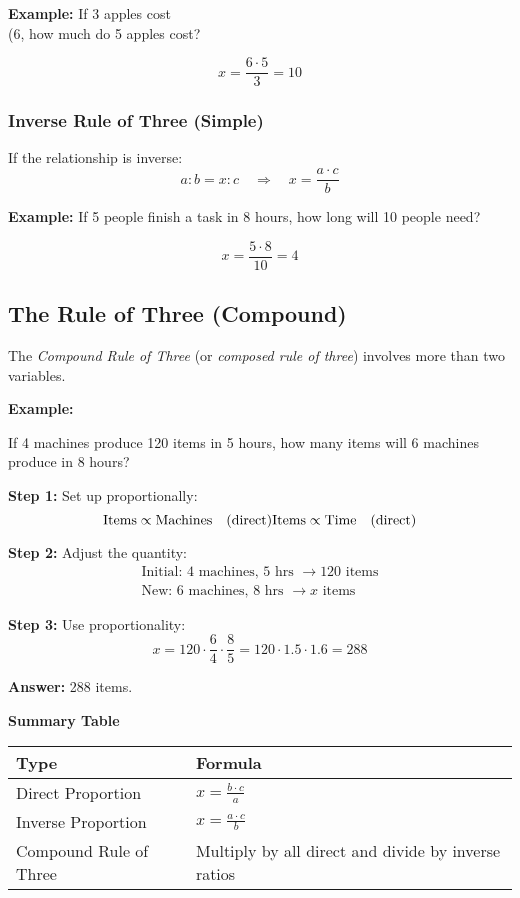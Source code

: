 \textbf{Example:} If 3 apples cost \\(6, how much do 5 apples cost?

\[
x = \frac{6 \cdot 5}{3} = 10
\]

\subsubsection*{Inverse Rule of Three (Simple)}

If the relationship is inverse:
\[
a : b = x : c \quad \Rightarrow \quad x = \frac{a \cdot c}{b}
\]

\textbf{Example:} If 5 people finish a task in 8 hours, how long will 10 people need?

\[
x = \frac{5 \cdot 8}{10} = 4
\]

\subsection{The Rule of Three (Compound)}

The \emph{Compound Rule of Three} (or \emph{composed rule of three}) involves more than two variables.

\textbf{Example:} 

If 4 machines produce 120 items in 5 hours, how many items will 6 machines produce in 8 hours?

\textbf{Step 1:} Set up proportionally:
\[
\text{Items} \propto \text{Machines} \quad (\text{direct}) \\
\text{Items} \propto \text{Time} \quad (\text{direct})
\]

\textbf{Step 2:} Adjust the quantity:
\begin{align*}
\text{Initial: } 4 \text{ machines, } 5 \text{ hrs } \rightarrow 120 \text{ items} \\
\text{New: } 6 \text{ machines, } 8 \text{ hrs } \rightarrow x \text{ items}
\end{align*}

\textbf{Step 3:} Use proportionality:
\[
x = 120 \cdot \frac{6}{4} \cdot \frac{8}{5} = 120 \cdot 1.5 \cdot 1.6 = 288
\]

\textbf{Answer:} 288 items.

\textbf{Summary Table}

\begin{center}
\begin{tabular}{|l|l|}
\hline
\textbf{Type} & \textbf{Formula} \\
\hline
Direct Proportion & \(x = \frac{b \cdot c}{a}\) \\
Inverse Proportion & \(x = \frac{a \cdot c}{b}\) \\
Compound Rule of Three & Multiply by all direct and divide by inverse ratios \\
\hline
\end{tabular}
\end{center}

